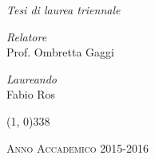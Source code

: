 \begin{titlepage}
\begin{center}
\begin{large}
\textsl{Tesi di laurea triennale}\\
\end{large}

\vspace{40pt} 

\begin{large}
\begin{flushleft}
\textit{Relatore}\\ 
\vspace{5pt} 
Prof. Ombretta Gaggi
\end{flushleft}

\vspace{0pt} 

\begin{flushright}
\textit{Laureando}\\ 
\vspace{5pt} 
Fabio Ros
\end{flushright}
\end{large}

\vspace{40pt}

\line(1, 0){338} \\
\begin{normalsize}
\textsc{Anno Accademico 2015-2016}
\end{normalsize}

\end{center}
\end{titlepage}

%